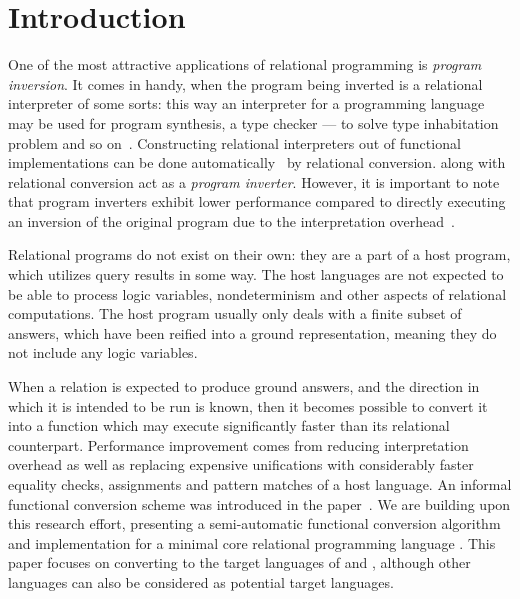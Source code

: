 \section{Introduction}
One of the most attractive applications of relational programming is \emph{program inversion}.
It comes in handy, when the program being inverted is a relational interpreter of some sorts: this way an interpreter for a programming language may be used for program synthesis, a type checker --- to solve type inhabitation problem and so on~\cite{Untagged, lozov2019relational}.
Constructing relational interpreters out of functional implementations can be done automatically~\cite{lozov2018typed} by relational conversion.
\mk along with relational conversion act as a \emph{program inverter}.
However, it is important to note that program inverters exhibit lower performance compared to directly executing an inversion of the original program due to the interpretation overhead~\cite{RevURA,SemanticsModifiers1}.

Relational programs do not exist on their own: they are a part of a host program, which utilizes query results in some way.
The host languages are not expected to be able to process logic variables, nondeterminism and other aspects of relational computations.
The host program usually only deals with a finite subset of answers, which have been reified into a ground representation, meaning they do not include any logic variables.

When a relation is expected to produce ground answers, and the direction in which it is intended to be run is known, then it becomes possible to convert it into a function which may execute significantly faster than its relational counterpart.
Performance improvement comes from reducing interpretation overhead as well as replacing expensive unifications with considerably faster equality checks, assignments and pattern matches of a host language.
An informal functional conversion scheme was introduced in the paper~\cite{verbitskaia2022direction}.
We are building upon this research effort, presenting a semi-automatic functional conversion algorithm and implementation for a minimal core relational programming language \micro.
This paper focuses on converting to the target languages of \haskell and \ocaml, although other languages can also be considered as potential target languages.

